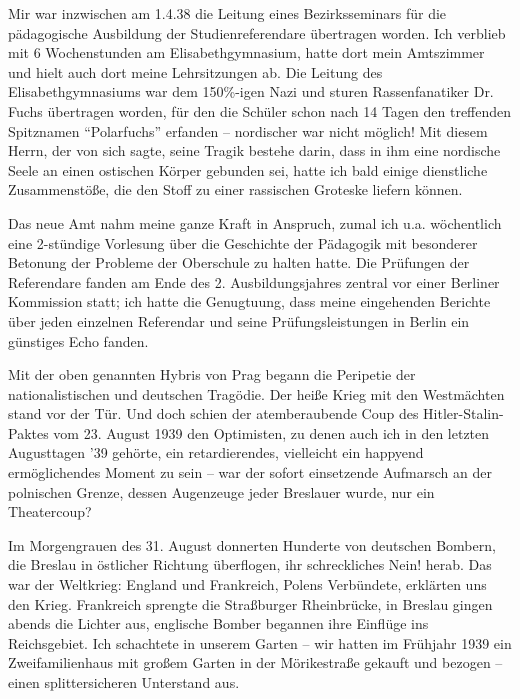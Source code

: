 \documentclass[a5paper,pagesize,10pt,twoside=true]{scrbook}
\renewcommand{\marginpar}[2][]{}
\begin{document}

Mir war inzwischen am 1.4.38 die Leitung eines Bezirksseminars für die pädagogische Ausbildung der Studienreferendare übertragen worden. Ich verblieb mit 6 Wochenstunden am Elisabethgymnasium, hatte dort mein Amtszimmer und hielt auch dort meine Lehrsitzungen ab. Die Leitung des Elisabethgymnasiums war dem 150\%-igen Nazi und sturen Rassenfanatiker Dr. Fuchs übertragen worden, für den die Schüler schon nach 14 Tagen den treffenden Spitznamen \enquote{Polarfuchs} erfanden -- nordischer war nicht möglich! Mit diesem Herrn, der von sich sagte, seine Tragik bestehe darin, dass in ihm eine nordische Seele an einen ostischen Körper gebunden sei, hatte ich bald einige dienstliche Zusammenstöße, die den Stoff zu einer rassischen Groteske liefern können.

Das neue Amt nahm meine ganze Kraft in Anspruch, zumal ich u.a. wöchentlich eine 2-stündige Vorlesung über die Geschichte der Pädagogik mit besonderer Betonung der Probleme der Oberschule zu halten hatte. Die Prüfungen der Referendare fanden am Ende des 2. Ausbildungsjahres zentral vor einer Berliner Kommission statt; ich hatte die Genugtuung, dass meine eingehenden Berichte über jeden einzelnen Referendar und seine Prüfungsleistungen in Berlin ein günstiges Echo fanden.

Mit der oben genannten Hybris von Prag begann die Peripetie der nationalistischen und deutschen Tragödie. Der heiße Krieg mit den Westmächten stand vor der Tür.\marginpar{21} Und doch schien der atemberaubende Coup des Hitler-Stalin-Paktes vom 23. August 1939 den Optimisten, zu denen auch ich in den letzten Augusttagen '39 gehörte, ein retardierendes, vielleicht ein happyend ermöglichendes Moment zu sein -- war der sofort einsetzende Aufmarsch an der polnischen Grenze, dessen Augenzeuge jeder Breslauer wurde, nur ein Theatercoup?

Im Morgengrauen des 31. August donnerten Hunderte von deutschen Bombern, die Breslau in östlicher Richtung überflogen, ihr schreckliches Nein! herab. Das war der Weltkrieg: England und Frankreich, Polens Verbündete, erklärten uns den Krieg. Frankreich sprengte die Straßburger Rheinbrücke, in Breslau gingen abends \marginpar{22} die Lichter aus, englische Bomber begannen ihre Einflüge ins Reichsgebiet. Ich schachtete in unserem Garten -- wir hatten im Frühjahr 1939 ein Zweifamilienhaus mit großem Garten in der Mörikestraße gekauft und bezogen -- einen splittersicheren Unterstand aus.
\end{document}
